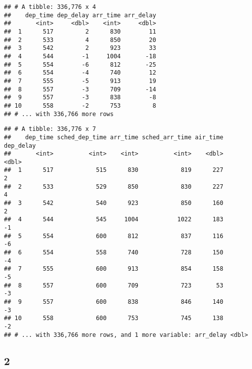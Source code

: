 \documentclass[]{article}
\newenvironment{Shaded}{\begin{snugshade}}{\end{snugshade}}
\newcommand{\KeywordTok}[1]{\textcolor[rgb]{0.13,0.29,0.53}{\textbf{#1}}}
\newcommand{\NormalTok}[1]{#1}
\newcommand{\OperatorTok}[1]{\textcolor[rgb]{0.81,0.36,0.00}{\textbf{#1}}}
\newcommand{\StringTok}[1]{\textcolor[rgb]{0.31,0.60,0.02}{#1}}
\begin{document}
\begin{verbatim}
## # A tibble: 336,776 x 4
##    dep_time dep_delay arr_time arr_delay
##       <int>     <dbl>    <int>     <dbl>
##  1      517         2      830        11
##  2      533         4      850        20
##  3      542         2      923        33
##  4      544        -1     1004       -18
##  5      554        -6      812       -25
##  6      554        -4      740        12
##  7      555        -5      913        19
##  8      557        -3      709       -14
##  9      557        -3      838        -8
## 10      558        -2      753         8
## # ... with 336,766 more rows
\end{verbatim}

\begin{Shaded}
\end{Shaded}

\begin{verbatim}
## # A tibble: 336,776 x 7
##    dep_time sched_dep_time arr_time sched_arr_time air_time dep_delay
##       <int>          <int>    <int>          <int>    <dbl>     <dbl>
##  1      517            515      830            819      227         2
##  2      533            529      850            830      227         4
##  3      542            540      923            850      160         2
##  4      544            545     1004           1022      183        -1
##  5      554            600      812            837      116        -6
##  6      554            558      740            728      150        -4
##  7      555            600      913            854      158        -5
##  8      557            600      709            723       53        -3
##  9      557            600      838            846      140        -3
## 10      558            600      753            745      138        -2
## # ... with 336,766 more rows, and 1 more variable: arr_delay <dbl>
\end{verbatim}

\hypertarget{section-2}{%
\subsection{2}\label{section-2}}
\end{document}
